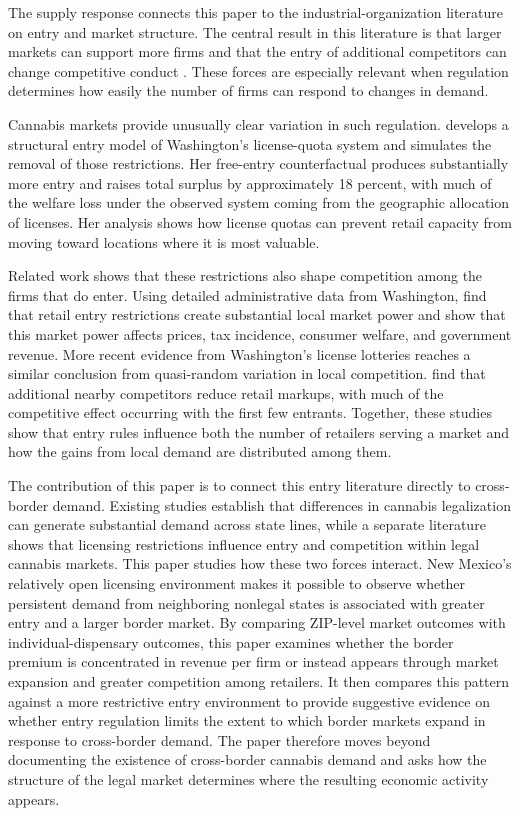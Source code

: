 \documentclass[12pt]{article}
\begin{document}
The supply response connects this paper to the industrial-organization literature on entry and market structure. The central result in this literature is that larger markets can support more firms and that the entry of additional competitors can change competitive conduct \cite{BresnahanReiss1991, BerryReiss2007}. These forces are especially relevant when regulation determines how easily the number of firms can respond to changes in demand.

Cannabis markets provide unusually clear variation in such regulation. \cite{thomas2019license} develops a structural entry model of Washington's license-quota system and simulates the removal of those restrictions. Her free-entry counterfactual produces substantially more entry and raises total surplus by approximately 18 percent, with much of the welfare loss under the observed system coming from the geographic allocation of licenses. Her analysis shows how license quotas can prevent retail capacity from moving toward locations where it is most valuable.

Related work shows that these restrictions also shape competition among the firms that do enter. Using detailed administrative data from Washington, \cite{HollenbeckUetake2021} find that retail entry restrictions create substantial local market power and show that this market power affects prices, tax incidence, consumer welfare, and government revenue. More recent evidence from Washington's license lotteries reaches a similar conclusion from quasi-random variation in local competition. \cite{HollenbeckHristakevaUetake2026} find that additional nearby competitors reduce retail markups, with much of the competitive effect occurring with the first few entrants. Together, these studies show that entry rules influence both the number of retailers serving a market and how the gains from local demand are distributed among them.

The contribution of this paper is to connect this entry literature directly to cross-border demand. Existing studies establish that differences in cannabis legalization can generate substantial demand across state lines, while a separate literature shows that licensing restrictions influence entry and competition within legal cannabis markets. This paper studies how these two forces interact. New Mexico's relatively open licensing environment makes it possible to observe whether persistent demand from neighboring nonlegal states is associated with greater entry and a larger border market. By comparing ZIP-level market outcomes with individual-dispensary outcomes, this paper examines whether the border premium is concentrated in revenue per firm or instead appears through market expansion and greater competition among retailers. It then compares this pattern against a more restrictive entry environment to provide suggestive evidence on whether entry regulation limits the extent to which border markets expand in response to cross-border demand. The paper therefore moves beyond documenting the existence of cross-border cannabis demand and asks how the structure of the legal market determines where the resulting economic activity appears.
\end{document}
